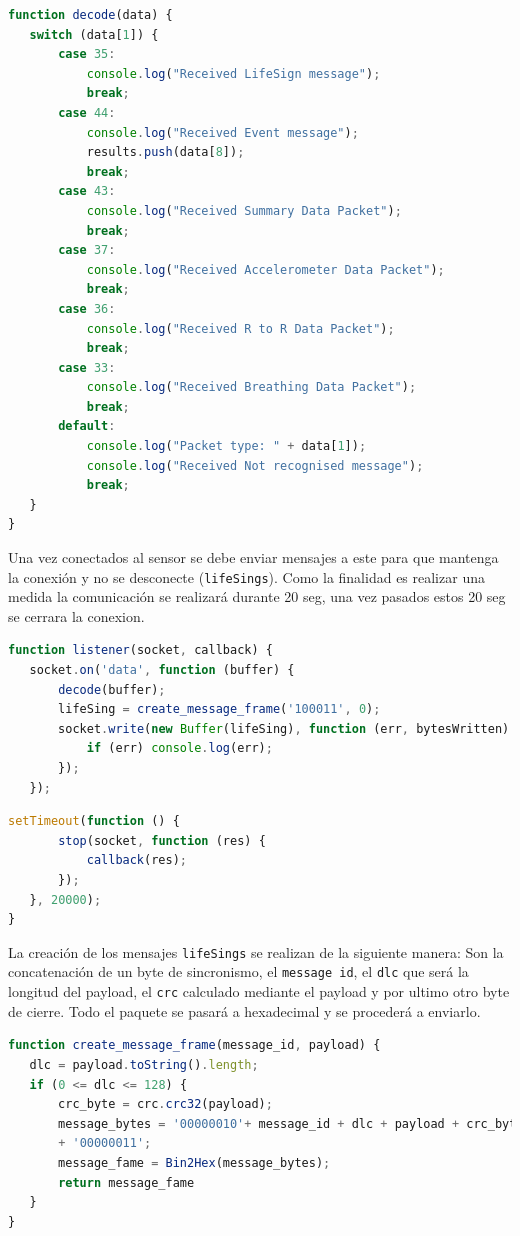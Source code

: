 \begin{lstlisting}[language=JavaScript]
function decode(data) {
   switch (data[1]) {
       case 35:
           console.log("Received LifeSign message");
           break;
       case 44:
           console.log("Received Event message");
           results.push(data[8]);
           break;
       case 43:
           console.log("Received Summary Data Packet");
           break;
       case 37:
           console.log("Received Accelerometer Data Packet");
           break;
       case 36:
           console.log("Received R to R Data Packet");
           break;
       case 33:
           console.log("Received Breathing Data Packet");
           break;
       default:
           console.log("Packet type: " + data[1]);
           console.log("Received Not recognised message");
           break;
   }
}
\end{lstlisting}

Una vez conectados al sensor se debe enviar mensajes a este para que mantenga la conexión y no se desconecte (\texttt{lifeSings}). Como la finalidad es realizar una medida la comunicación se realizará durante 20 seg, una vez pasados estos 20 seg se cerrara la conexion. 

\begin{lstlisting}[language=JavaScript]
function listener(socket, callback) {
   socket.on('data', function (buffer) {
       decode(buffer);
       lifeSing = create_message_frame('100011', 0);
       socket.write(new Buffer(lifeSing), function (err, bytesWritten) {
           if (err) console.log(err);
       });
   });
   \end{lstlisting}
   \pagebreak
   \begin{lstlisting}[language=JavaScript]
   setTimeout(function () {
       stop(socket, function (res) {
           callback(res);
       });
   }, 20000);
}
\end{lstlisting}

La creación de los mensajes \texttt{lifeSings} se realizan de la siguiente manera: Son la concatenación de un byte de sincronismo, el \texttt{message id}, el \texttt{dlc} que será la longitud del payload, el \texttt{crc} calculado mediante el payload y por ultimo otro byte de cierre. Todo el paquete se pasará a hexadecimal y se procederá a enviarlo.

\begin{lstlisting}[language=JavaScript]
function create_message_frame(message_id, payload) {
   dlc = payload.toString().length;
   if (0 <= dlc <= 128) {
       crc_byte = crc.crc32(payload);
       message_bytes = '00000010'+ message_id + dlc + payload + crc_byte 
       + '00000011';
       message_fame = Bin2Hex(message_bytes);
       return message_fame
   }
}
\end{lstlisting}

